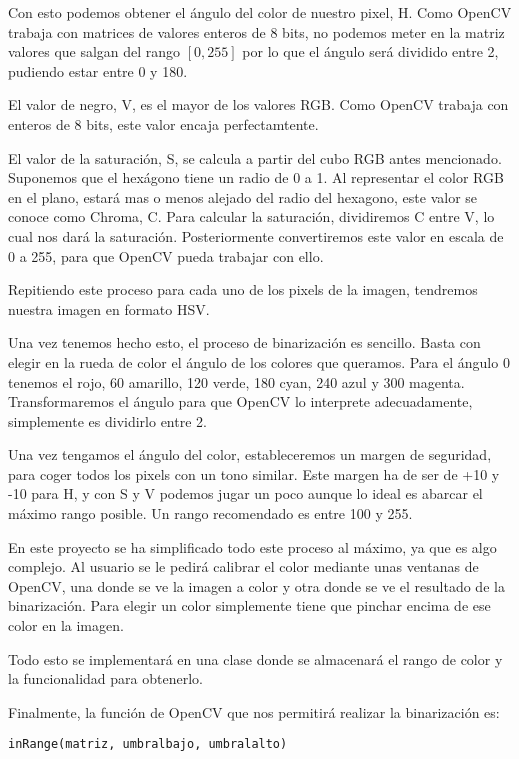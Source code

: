 Con esto podemos obtener el ángulo del color de nuestro pixel, H. Como OpenCV trabaja con matrices de valores enteros de 8 bits, no podemos meter en la matriz valores que salgan del rango $[0,255]$ por lo que el ángulo será dividido entre 2, pudiendo estar entre 0 y 180.

El valor de negro, V, es el mayor de los valores RGB. Como OpenCV trabaja con enteros de 8 bits, este valor encaja perfectamtente.

El valor de la saturación, S, se calcula a partir del cubo RGB antes mencionado. Suponemos que el hexágono tiene un radio de 0 a 1. Al representar el color RGB en el plano, estará mas o menos alejado del radio del hexagono, este valor se conoce como Chroma, C. Para calcular la saturación, dividiremos C entre V, lo cual nos dará la saturación. Posteriormente convertiremos este valor en escala de 0 a 255, para que OpenCV pueda trabajar con ello.

Repitiendo este proceso para cada uno de los pixels de la imagen, tendremos nuestra imagen en formato HSV.

Una vez tenemos hecho esto, el proceso de binarización es sencillo. Basta con elegir en la rueda de color el ángulo de los colores que queramos. Para el ángulo 0 tenemos el rojo, 60 amarillo, 120 verde, 180 cyan, 240 azul y 300 magenta. Transformaremos el ángulo para que OpenCV lo interprete adecuadamente, simplemente es dividirlo entre 2.

Una vez tengamos el ángulo del color, estableceremos un margen de seguridad\cite{track_hsv}, para coger todos los pixels con un tono similar. Este margen ha de ser de +10 y -10 para H, y con S y V podemos jugar un poco aunque lo ideal es abarcar el máximo rango posible. Un rango recomendado es entre 100 y 255.


En este proyecto se ha simplificado todo este proceso al máximo, ya que es algo complejo. Al usuario se le pedirá calibrar el color mediante unas ventanas de OpenCV, una donde se ve la imagen a color y otra donde se ve el resultado de la binarización. Para elegir un color simplemente tiene que pinchar encima de ese color en la imagen.

Todo esto se implementará en una clase donde se almacenará el rango de color y la funcionalidad para obtenerlo.

Finalmente, la función de OpenCV que nos permitirá realizar la binarización es:
\begin{verbatim}
inRange(matriz, umbralbajo, umbralalto)
\end{verbatim}

